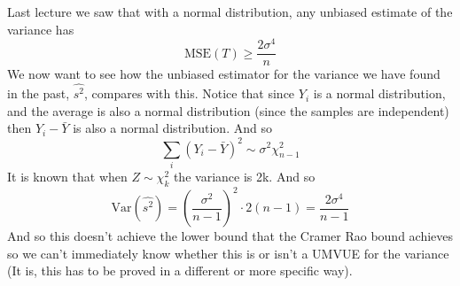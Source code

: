 \documentclass[../main.tex]{subfiles}
\begin{document}
Last lecture we saw that with a normal distribution, any unbiased estimate of the variance has 
\[\text{MSE}(T)\geq \frac{2\sigma^4}{n}\]
We now want to see how the unbiased estimator for the variance we have found in the past, $\hat{s^2}$, compares with this. 
Notice that since $Y_i$ is a normal distribution, and the average is also a normal distribution (since the samples are independent) then $Y_i-\bar{Y}$ is also a normal distribution. And so
\[\sum_i \left(Y_i-\bar{Y}\right)^2 \sim \sigma^2 \chi^2_{n-1}\]
It is known that when $Z\sim\chi_k^2$ the variance is 2k. And so 
\[\text{Var}(\hat{s^2}) = \left(\frac{\sigma^2}{n-1}\right)^2\cdot 2(n-1) = \frac{2\sigma^4}{n-1}\]
And so this doesn't achieve the lower bound that the Cramer Rao bound achieves so we can't immediately know whether this is or isn't a UMVUE for the variance (It is, this has to be proved in a different or more specific way). \\\\
\end{document}
